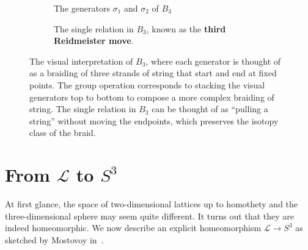 \documentclass[12pt,twoside]{reedthesis}
\theoremstyle{definition}
\newcommand{\LS}{\mathcal{L}}
\begin{document}
\vspace{1em}
\begin{figure}[h]
  \centering
  \begin{subfigure}[t]{0.48\textwidth}
    \centering
    \hspace{10mm}
    \caption{The generators $\sigma_1$ and $\sigma_2$ of $B_3$}
  \end{subfigure}
  \hfill
  \begin{subfigure}[t]{0.48\textwidth}
    \centering
    \caption{The single relation in $B_3$, known as the \textbf{third Reidmeister move}.}
  \end{subfigure}
  \caption{The visual interpretation of $B_3$, where each generator is thought of as a braiding of three strands of string that start and end at fixed points. The group operation corresponds to stacking the visual generators top to bottom to compose a more complex braiding of string. The single relation in $B_3$ can be thought of as ``pulling a string'' without moving the endpoints, which preserves the isotopy class of the braid.}
  \label{fig:visual_braid_group}
\end{figure}

\section{From $\LS$ to $S^3$}\label{sec:lattice_to_s3}

At first glance, the space of two-dimensional lattices up to homothety and the three-dimensional sphere may seem quite different.
It turns out that they are indeed homeomorphic.
We now describe an explicit homeomorphism $\LS \to S^3$ as sketched by Mostovoy in~\cite{mostovoy2004}.
\end{document}
